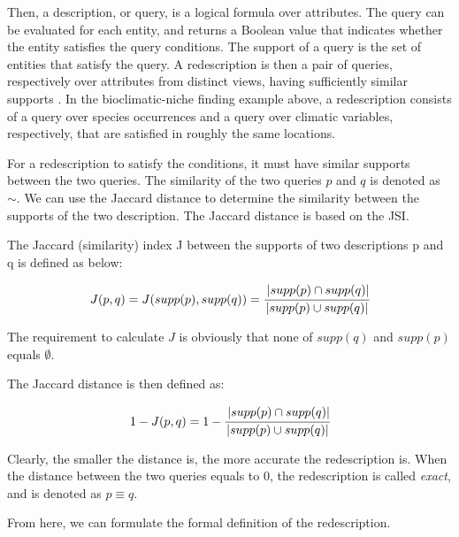 Then, a description, or query, is a logical formula over attributes.
The query can be evaluated for each entity, and returns a Boolean value that indicates whether the entity satisfies the query conditions.
The support of a query is the set of entities that satisfy the query.
A redescription is then a pair of queries, respectively over attributes from distinct views, having sufficiently similar supports \cite{galbrun2018redescription}.
In the bioclimatic-niche finding example above, a redescription consists of a query over species occurrences and a query over climatic variables, respectively, that are satisfied in roughly the same locations.

For a redescription to satisfy the conditions, it must have similar supports between the two queries.
The similarity of the two queries $p$ and $q$ is denoted as $\sim$.
We can use the Jaccard distance to determine the similarity between the supports of the two description.
The Jaccard distance is based on the \acl{JSI}.

\begin{definition}
    The Jaccard (similarity) index J between the supports of two descriptions p and q is defined as below:

    \begin{equation}
        J(p, q) = J(supp(p), supp(q)) = \cfrac{\left|supp(p)\cap supp(q)\right|}{\left|supp(p)\cup supp(q)\right|}
    \end{equation}
\end{definition}

The requirement to calculate $J$ is obviously that none of $supp(q)$ and $supp(p)$ equals $\emptyset$.

\begin{definition}
    The Jaccard distance is then defined as:

    \begin{equation}
        1 - J(p, q) = 1 - \cfrac{\left|supp(p)\cap supp(q)\right|}{\left|supp(p)\cup supp(q)\right|}
    \end{equation}
\end{definition}

Clearly, the smaller the distance is, the more accurate the redescription is.
When the distance between the two queries equals to $0$, the redescription is called \textit{exact}, and is denoted as $p \equiv q$.

From here, we can formulate the formal definition of the redescription.

